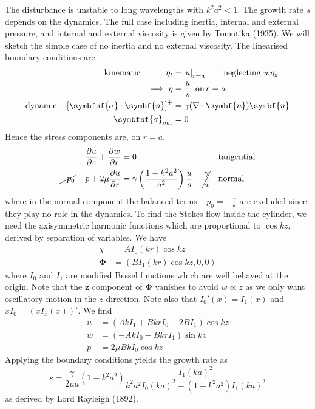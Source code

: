 \documentclass{jknotes}
\begin{document}
The disturbance is unstable to long wavelengths with $k^2 a^2 < 1$. The growth
rate $s$ depends on the dynamics. The full case including inertia, internal
and external pressure, and internal and external viscosity is given by
Tomotika (1935). We will sketch the simple case of no inertia and no external
viscosity. The linearised boundary conditions are
\begin{align}
	\text{kinematic} \hspace{3em}\eta_t &= \left.u\right|_{r=a} \hspace{2em}
	\text{neglecting} \,\, w \eta_z \\
	 \implies \eta &= \frac{u}{s} \,\,\,\text{on}\,r=a \\ 
	 \text{dynamic}\hspace{1em}
	 \left[ \symbfsf{\sigma}\cdot\symbf{n}\right]_-^+ &= \gamma (\nabla \cdot
	 \symbf{n})\symbf{n} \\
	\symbfsf{\sigma}_{\text{out}} &= 0 
\end{align}
Hence the stress components are, on $r=a$,
\begin{align}
	\frac{\partial u}{\partial z} + \frac{\partial w}{\partial r} &= 0
																																				&&\text{tangential}\\
	\cancel{-p_0}-p + 2\mu \frac{\partial u}{\partial r} &= \gamma \left(
	\frac{1-k^2a^2}{a^2}\right) \frac{u}{s} - \cancel{\frac{\gamma}{a}}
	&&\text{normal}
\end{align}
where in the normal component the balanced terms $-p_0 = -\frac{\gamma}{a}$
are excluded since they play no role in the dynamics. To find the Stokes flow
inside the cylinder, we need the axisymmetric harmonic functions which are
proportional to $\cos kz$, derived by separation of variables. We have
\begin{align}
	\chi &= A I_0(kr) \cos kz \\
	\symbf{\Phi} &= (BI_1(kr) \cos  kz, 0,0)
\end{align}
where $I_0$ and $I_1$ are modified Bessel functions which are well behaved at
the origin. Note that the $\hat{\symbf{z}}$ component of $\symbf{\Phi}$
vanishes to avoid $w \propto z$ as we only want oscillatory motion in the $z$
direction. Note also that $I_0'(x) = I_1(x)$ and $xI_0 = (x I_x(x))'$. We find
\begin{align}
	u &= (AkI_1 + Bkr I_0 - 2BI_1) \cos kz \\
	w &= (-AkI_0 - Bkr I_1) \sin kz \\
	p &= 2 \mu B k I_0 \cos kz
\end{align}
Applying the boundary conditions yields the growth rate as
\begin{equation}
	s = \frac{\gamma}{2\mu a} (1-k^2 a^2) \frac{I_1(ka)^2}{k^2 a^2 I_0(ka)^2
	- (1+k^2 a^2) I_1(ka)^2}
\end{equation}
as derived by Lord Rayleigh (1892).
\end{document}
